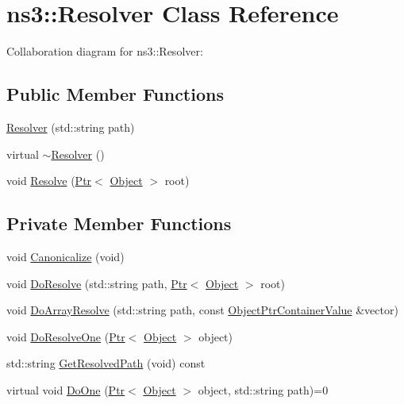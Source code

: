 \hypertarget{classns3_1_1Resolver}{}\section{ns3\+:\+:Resolver Class Reference}
\label{classns3_1_1Resolver}


Collaboration diagram for ns3\+:\+:Resolver\+:
\subsection*{Public Member Functions}
\begin{DoxyCompactItemize}
\item 
\hyperlink{classns3_1_1Resolver_aacc39f1f92a6a127e71210936f7f7d35}{Resolver} (std\+::string path)
\item 
virtual \hyperlink{classns3_1_1Resolver_a535b2ed38f99035190ed86b28b139aa4}{$\sim$\+Resolver} ()
\item 
void \hyperlink{classns3_1_1Resolver_ac3768bb1d9c145634bebc378cc5bb4fd}{Resolve} (\hyperlink{classns3_1_1Ptr}{Ptr}$<$ \hyperlink{classns3_1_1Object}{Object} $>$ root)
\end{DoxyCompactItemize}
\subsection*{Private Member Functions}
\begin{DoxyCompactItemize}
\item 
void \hyperlink{classns3_1_1Resolver_a17e3b2dbd56da7d36782f3926713b48f}{Canonicalize} (void)
\item 
void \hyperlink{classns3_1_1Resolver_ae91ec5c188ee8da874e4915193efb000}{Do\+Resolve} (std\+::string path, \hyperlink{classns3_1_1Ptr}{Ptr}$<$ \hyperlink{classns3_1_1Object}{Object} $>$ root)
\item 
void \hyperlink{classns3_1_1Resolver_a09cf9f78d05d8734280769d3daa5d8cc}{Do\+Array\+Resolve} (std\+::string path, const \hyperlink{classns3_1_1ObjectPtrContainerValue}{Object\+Ptr\+Container\+Value} \&vector)
\item 
void \hyperlink{classns3_1_1Resolver_afec0017d66e82c51303cb200273108dc}{Do\+Resolve\+One} (\hyperlink{classns3_1_1Ptr}{Ptr}$<$ \hyperlink{classns3_1_1Object}{Object} $>$ object)
\item 
std\+::string \hyperlink{classns3_1_1Resolver_a0788cf21229e40fba6219ec44b9148bb}{Get\+Resolved\+Path} (void) const 
\item 
virtual void \hyperlink{classns3_1_1Resolver_afba9f35df8976f26b6de7be7350a49d4}{Do\+One} (\hyperlink{classns3_1_1Ptr}{Ptr}$<$ \hyperlink{classns3_1_1Object}{Object} $>$ object, std\+::string path)=0
\end{DoxyCompactItemize}
